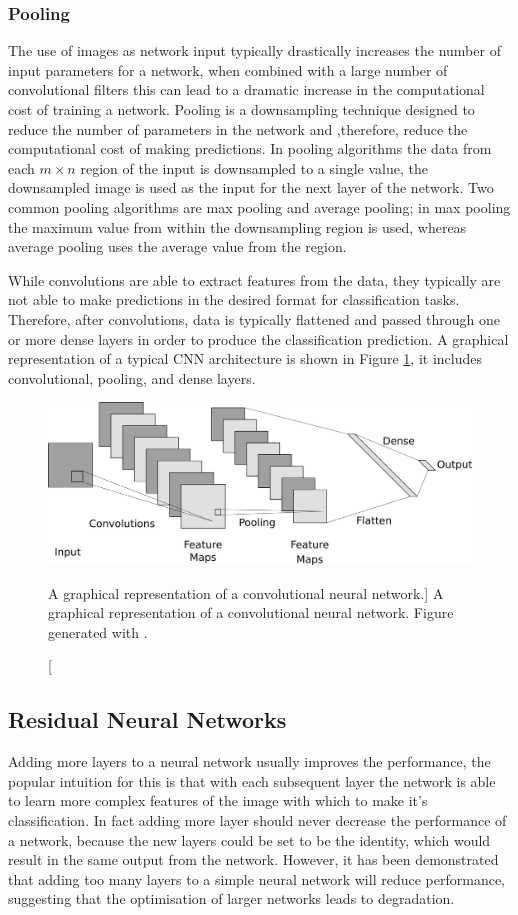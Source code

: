 \subsubsection*{Pooling}
The use of images as network input typically drastically increases the number of
input parameters for a network, when combined with a large number of
convolutional filters this can lead to a dramatic increase in the computational
cost of training a network. Pooling\cite{5537907} is a downsampling technique 
designed to reduce the number of parameters in the network and ,therefore, 
reduce the computational cost of making predictions. In pooling algorithms
the data from each $m \times n$ region of the input is downsampled to a single 
value, the downsampled image is used as the input for the next layer of the 
network. Two common pooling algorithms are max pooling and average pooling; in 
max pooling the maximum value from within the downsampling region is used, 
whereas average pooling uses the average value from the region.

\bigskip
\noindent
While convolutions are able to extract features from the data, they typically
are not able to make predictions in the desired format for classification tasks.
Therefore, after convolutions, data is typically flattened and passed through
one or more dense layers in order to produce the classification prediction. A
graphical representation of a typical CNN architecture is shown in Figure
\ref{fig:cnn_layer}, it includes convolutional, pooling, and dense layers.
\begin{figure}
	\centering
	\includegraphics[width = \textwidth]{figures/cnn_layer.png}
	\caption
	[A graphical representation of a convolutional neural network.]
	{ A graphical representation of a convolutional neural network. Figure
	generated with \cite{cnn_diagrams}.}
	\label{fig:cnn_layer}
\end{figure}

\subsection{Residual Neural Networks}
Adding more layers to a neural network usually improves the performance, the
popular intuition for this is that with each subsequent layer the network is
able to learn more complex features of the image with which to make it's
classification. In fact adding more layer should never decrease the 
performance of a network, because the new layers could be set to be the 
identity, which would result in the same output from the network. However, it 
has been demonstrated that adding too many layers to a simple neural network 
will reduce performance, suggesting that the optimisation of
larger networks leads to degradation\cite{He_2016_CVPR}.

